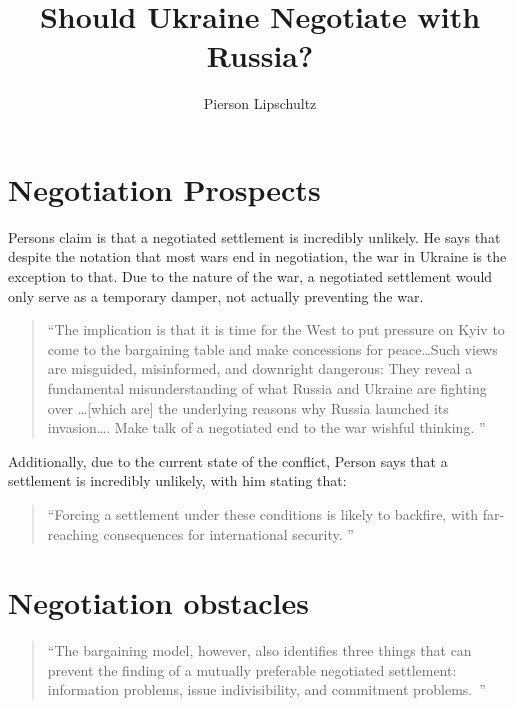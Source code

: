 \documentclass{article}
\title{Should Ukraine Negotiate with Russia?}
\author{Pierson Lipschultz}
\begin{document}
\maketitle

\section{Negotiation Prospects}
    Persons claim is that a negotiated settlement is incredibly unlikely. He says that despite the notation that most wars end in negotiation, the war in Ukraine is the exception to that. Due to the nature of the war, a negotiated settlement would only serve as a temporary damper, not actually preventing the war.

    \begin{quote} \label{}
       ``The implication is that it is time for the West to put pressure on Kyiv to come to the bargaining table and make concessions for peace\ldots Such views are misguided, misinformed, and downright dangerous: They reveal a fundamental misunderstanding of what Russia and Ukraine are fighting over \ldots [which are] the underlying reasons why Russia launched its invasion\ldots. Make talk of a negotiated end to the war wishful thinking. \cite{person_2025}''
    \end{quote}

    Additionally, due to the current state of the conflict, Person says that a settlement is incredibly unlikely, with him stating that:

    \begin{quote}
        ``Forcing a settlement under these conditions is likely to backfire, with far-reaching consequences for international security. \cite{person_2025}''
    \end{quote}

\section{Negotiation obstacles}
    \begin{quote}
        ``The bargaining model, however, also identifies three things that can prevent the finding of a mutually preferable negotiated settlement: information problems, issue indivisibility, and commitment problems.~\cite{person_2025}''
    \end{quote}
\end{document}
